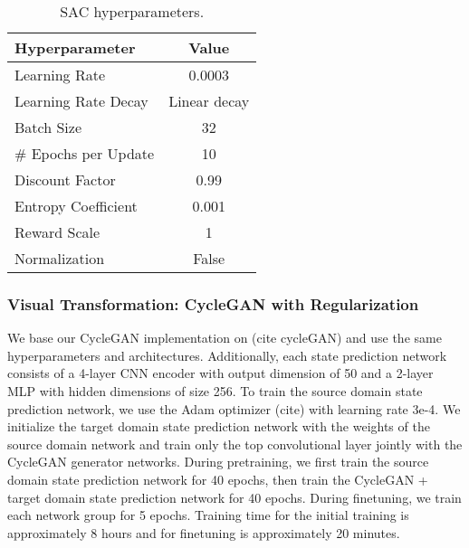 \begin{table}[ht]
    \caption{SAC hyperparameters.}
    \label{tab:sac_hyperparameter}
    \centering
    \begin{tabular}{lc}
        \toprule
        Hyperparameter & Value \\
        \midrule
        Learning Rate & 0.0003 \\
        Learning Rate Decay & Linear decay \\
        Batch Size & 32 \\
        \# Epochs per Update & 10 \\
        Discount Factor & 0.99 \\
        Entropy Coefficient & 0.001 \\
        Reward Scale & 1  \\
        Normalization & False \\
        \bottomrule
    \end{tabular}
\end{table}

\subsubsection{\textbf{Visual Transformation: CycleGAN with Regularization}}
We base our CycleGAN implementation on (cite cycleGAN) and use the same hyperparameters and architectures.  Additionally, each state prediction network consists of a 4-layer CNN encoder with output dimension of 50 and a 2-layer MLP with hidden dimensions of size 256.  To train the source domain state prediction network, we use the Adam optimizer (cite) with learning rate 3e-4.  We initialize the target domain state prediction network with the weights of the source domain network and train only the top convolutional layer jointly with the CycleGAN generator networks.  During pretraining, we first train the source domain state prediction network for 40 epochs, then train the CycleGAN + target domain state prediction network for 40 epochs.  During finetuning, we train each network group for 5 epochs. Training time for the initial training is approximately 8 hours and for finetuning is approximately 20 minutes.

